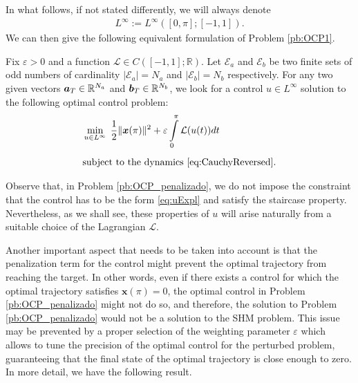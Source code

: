 \documentclass[twocolumn]{autart}    %
\begin{document}
In what follows, if not stated differently, we will always denote
\begin{align*}
	L^\infty:=L^\infty ([0,\pi]; [-1,1]).
\end{align*}
We can then give the following equivalent formulation of Problem \ref{pb:OCP1}.

\bigskip

\begin{problem}\label{pb:OCP_penalizado}
Fix $\varepsilon>0$ and a function $\mathcal{L}\in C([-1,1];\mathbb{R})$.  Let $\mathcal{E} _a $ and $\mathcal{E} _b $ be two finite sets of odd numbers of cardinality $|\mathcal{E}_a| = N_a $ and $ |\mathcal{E} _b| = N_b$ respectively. For any two given vectors $\bm{a}_T \in \mathbb{R}^{N_a}$ and $\bm{b}_T \in \mathbb{R}^{N_b} $, we look for a control $u\in L^\infty$ solution to the following optimal control problem:
\begin{align*}
	&\displaystyle\min_{u \in L^\infty}\;\dfrac{1}{2} \|\bm{x}(\pi)\|^2 + \varepsilon \displaystyle\int_0^\pi \mathcal{L}(u(t)) dt 
	\\[5pt] 
	&\text{subject to the dynamics \eqref{eq:CauchyReversed}}.
\end{align*}
\end{problem}
Observe that, in Problem \ref{pb:OCP_penalizado}, we do not impose the constraint that the control has to be the form \eqref{eq:uExpl} and satisfy the staircase property. Nevertheless, as we shall see, these properties of $u$ will arise naturally from a suitable choice of the Lagrangian $\mathcal{L}$.

Another important aspect that needs to be taken into account is that the penalization term for the control might prevent the optimal trajectory from reaching the target. In other words, even if there exists a control for which the optimal trajectory satisfies $\bm{x} (\pi) = 0$, the optimal control in Problem \ref{pb:OCP_penalizado} might not do so, and therefore, the solution to Problem \ref{pb:OCP_penalizado} would not be a solution to the SHM problem. This issue may be prevented by a proper selection of the weighting parameter $\varepsilon$ which allows to tune the precision of the optimal control for the perturbed problem, guaranteeing that the final state of the optimal trajectory is close enough to zero. In more detail, we have the following result.
\end{document}

